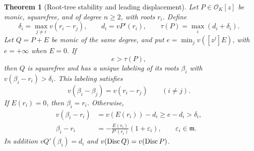 \documentclass[11pt,letterpaper,oneside]{article}
\numberwithin{equation}{section}
\newtheorem{theorem}{Theorem}[section]
\theoremstyle{definition}
\theoremstyle{remark}\newtheorem{remark}[theorem]{Remark}
\newcommand{\OO}{\mathcal O}\newcommand{\mm}{\mathfrak m}
\begin{document}
\begin{theorem}[Root-tree stability and leading displacement]\label{thm:precision}
Let $P\in\OO_K[z]$ be monic, squarefree, and of degree $n\geq2$, with
roots $r_i$. Define
\[
 \delta_i=\max_{j\ne i}v(r_i-r_j),\qquad
 d_i=vP'(r_i),\qquad \tau(P)=\max_i(d_i+\delta_i).
\]
Let $Q=P+E$ be monic of the same degree, and put
$e=\min_jv([z^j]E)$, with $e=+\infty$ when $E=0$.
If
\begin{equation}\label{eq:precisionthreshold}
 e>\tau(P),
\end{equation}
then $Q$ is squarefree and has a unique labeling of its roots $\beta_i$
with $v(\beta_i-r_i)>\delta_i$. This labeling satisfies
\begin{equation}\label{eq:treepreservation}
 v(\beta_i-\beta_j)=v(r_i-r_j)\qquad(i\ne j).
\end{equation}
If $E(r_i)=0$, then $\beta_i=r_i$. Otherwise,
\begin{align}
 v(\beta_i-r_i)&=v(E(r_i))-d_i\geq e-d_i>\delta_i,
 \label{eq:rootprecision}\\
 \beta_i-r_i&=-\frac{E(r_i)}{P'(r_i)}(1+\varepsilon_i),
 \qquad \varepsilon_i\in\mm.\label{eq:rootfirstorder}
\end{align}
In addition $vQ'(\beta_i)=d_i$ and $v(\operatorname{Disc} Q)=v(\operatorname{Disc} P)$.
\end{theorem}
\end{document}
